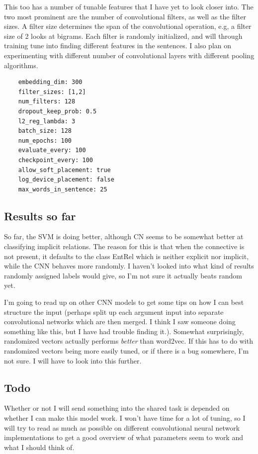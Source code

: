 This too has a number of tunable features that I have yet to look closer into. The two most prominent are the number of convolutional filters, as well as the filter sizes. A filter size determines the span of the convolutional operation, e.g, a filter size of 2 looks at bigrams. Each filter is randomly initialized, and will through training tune into finding different features in the sentences. I also plan on experimenting with different number of convolutional layers with different pooling algorithms.

\begin{verbatim}
	embedding_dim: 300
	filter_sizes: [1,2]
	num_filters: 128
	dropout_keep_prob: 0.5
	l2_reg_lambda: 3
	batch_size: 128
	num_epochs: 100
	evaluate_every: 100
	checkpoint_every: 100
	allow_soft_placement: true
	log_device_placement: false
	max_words_in_sentence: 25
\end{verbatim}

\subsection{Results so far}

So far, the SVM is doing better, although CN seems to be somewhat better at classifying implicit relations. The reason for this is that when the connective is not present, it defaults to the class EntRel which is neither explicit nor implicit, while the CNN behaves more randomly. I haven't looked into what kind of results randomly assigned labels would give, so I'm not sure it actually beats random yet.

I'm going to read up on other CNN models to get some tips on how I can best structure the input (perhaps split up each argument input into separate convolutional networks which are then merged. I think I saw someone doing something like this, but I have had trouble finding it.). Somewhat surprisingly, randomized vectors actually performs \emph{better} than word2vec. If this has to do with randomized vectors being more easily tuned, or if there is a bug somewhere, I'm not sure. I will have to look into this further.

\subsection{Todo}

Whether or not I will send something into the shared task is depended on whether I can make this model work. I won't have time for a lot of tuning, so I will try to read as much as possible on different convolutional neural network implementations to get a good overview of what parameters seem to work and what I should think of.
